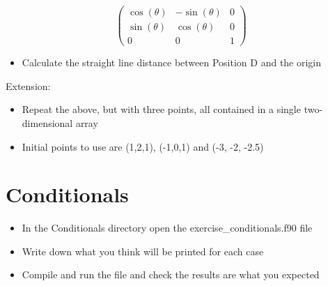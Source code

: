 \documentclass[11pt,a4paper]{article}
\begin{document}
\begin{equation}
\begin{pmatrix}
\cos{(\theta)} & -\sin{(\theta)} & 0\\
\sin{(\theta)} & \cos{(\theta)} & 0 \\
0 & 0 & 1
\end{pmatrix}
\end{equation}

\begin{itemize}
    \item Calculate the straight line distance between Position D and the origin
\end{itemize}

Extension:
\begin{itemize}
    \item Repeat the above, but with three points, all contained in a single two-dimensional array
    \item Initial points to use are (1,2,1), (-1,0,1) and (-3, -2, -2.5)
\end{itemize}

\section{Conditionals}
\begin{itemize}
    \item In the Conditionals directory open the exercise\_conditionals.f90 file
    \item Write down what you think will be printed for each case
    \item Compile and run the file and check the results are what you expected
\end{itemize}
\end{document}
